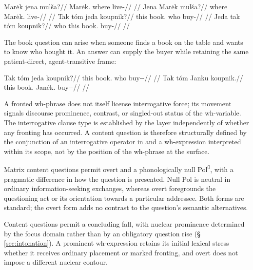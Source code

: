 \pex
\a
\begingl
\gla Marėk jena mulša?//
\glb Marėk.\Dir{} where live-\Cont{}//
\glft {} //
\endgl
\a
\begingl
\gla Jena Marėk mulša?//
\glb where Marėk.\Dir{} live-\Cont{}//
\glft {} //
\endgl
\a
\begingl
\gla Tak tóm jeda koupnik?//
\glb this book.\Dir{} who buy-\Pf{}//
\glft {} //
\endgl
\a
\begingl
\gla Jeda tak tóm koupnik?//
\glb who this book.\Dir{} buy-\Pf{}//
\glft {} //
\endgl
\xe

The book question can arise when someone finds a book on the table and
wants to know who bought it. An answer can supply the buyer while retaining
the same patient-direct, agent-transitive frame:

\pex\label{ex:wh-book-answer}
\a
\begingl
\gla Tak tóm jeda koupnik?//
\glb this book.\Dir{} who buy-\Trs{}-\Pf{}//
\glft {}
//
\endgl
\a
\begingl
\gla Tak tóm Janku koupnik.//
\glb this book.\Dir{} Janėk.\Trs{} buy-\Trs{}-\Pf{}//
\glft {}
//
\endgl
\xe

A fronted wh-phrase does not itself license interrogative force; its movement
signals discourse prominence, contrast, or singled-out status of the
wh-variable. The interrogative clause type is established by the 
layer independently of whether any fronting has occurred. A content question is
therefore structurally defined by the conjunction of an interrogative operator
in  and a wh-expression interpreted within its scope, not by the position
of the wh-phrase at the surface.

Matrix content questions permit overt  and a phonologically null
Pol\textsuperscript{0}, with a pragmatic difference in how the question is
presented. Null Pol is neutral in ordinary information-seeking exchanges,
whereas overt  foregrounds the questioning act or its orientation
towards a particular addressee. Both forms are standard; the overt form
adds no contrast to the question's semantic alternatives.

Content questions permit a concluding fall, with nuclear prominence
determined by the focus domain rather than by an obligatory question rise
(§\,\ref{sec:intonation}). A prominent wh-expression retains its initial
lexical stress whether it receives ordinary placement or marked fronting,
and overt  does not impose a different nuclear contour.

